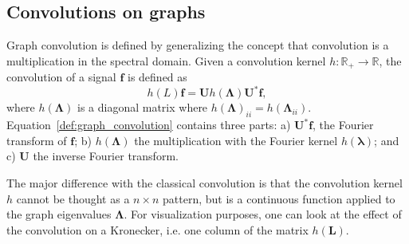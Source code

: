 \documentclass[final,twocolumn,3p,times,authoryear]{elsarticle}
\newcommand{\nati}[1]{{\color[rgb]{.1,.6,.1}{#1}}}
\newcommand{\todo}[1]{{\color[rgb]{.6,.1,.6}{#1}}}
\newcommand{\assign}[1]{{\color[rgb]{.8,.5,.8}{Assigned: #1 }}}
\renewcommand{\b}[1]{{\bm{#1}}}   %
\newcommand{\1}{\b{1}}              %
\newcommand{\0}{\b{0}}              %
\renewcommand{\L}{\b{L}} %
\newcommand{\U}{\b{U}}
\newcommand{\bLambda}{\b{\Lambda}}
\newcommand{\blambda}{\b{\lambda}}
\begin{document}
\subsection{Convolutions on graphs}
\assign{Nathanaël, Michaël} \todo{Add a few extra references}

Graph convolution is defined by generalizing the concept that convolution is a
multiplication in the spectral domain. Given a convolution kernel 
$h:\mathbb{R}_+\rightarrow\mathbb{R}$, the convolution of a signal $\b{f}$ 
is defined as
\begin{equation} \label{def:graph_convolution}
h(L)\b{f} = \U h(\bLambda) \U^* \b{f},
\end{equation}
where $h(\bLambda)$ is a diagonal matrix where $h(\bLambda)_{ii}=h(\bLambda_{ii})$.
Equation~\ref{def:graph_convolution} contains three parts: a) $\U^* \b{f}$, the 
Fourier transform of $\b{f}$; b) $h(\bLambda)$ the multiplication with the Fourier 
kernel $h(\blambda)$; and c) $\U$ the inverse Fourier transform.

The major difference with the classical convolution is that the convolution kernel
$h$ cannot be thought as a $n \times n$ pattern, but is a continuous function
applied to the graph eigenvalues $\bLambda$. For visualization purposes, one can
look at the effect of the convolution on a Kronecker, i.e. one column of the matrix
$h(\L)$. \nati{However, due to the non-regularity of the graph (i.e. the fact
that there is not perfect sampling on the sphere), this visualization will
differ from one node to another. In the specific case of the full sphere, these
differences are negligible in most of the cases. When considering only subpart of
the sphere, one will observe important border effects.}
\end{document}
